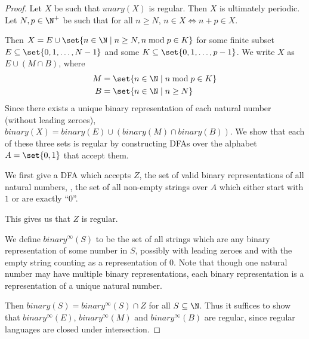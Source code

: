 \documentclass[12pt]{article}
\begin{document}
\begin{proof}
    Let $X$ be such that $unary(X)$ is regular.
    Then $X$ is ultimately periodic.
    Let $N, p \in \N^+$ be such that for all $n \ge N$, $n \in X \iff n + p
    \in X$.

    Then $X = E \cup \set{n \in \N \mid n \ge N, n \bmod p \in K}$ for
    some finite subset $E \subseteq \set{0, 1, \ldots, N-1}$ and some
    $K \subseteq \set{0, 1, \dots, p-1}$.
    We write $X$ as $E \cup (M \cap B)$, where \begin{align*}
        M &= \set{n \in \N \mid n \bmod p \in K} \\
        B &= \set{n \in \N \mid n \ge N}
    \end{align*}
    Since there exists a unique binary representation of each natural number
    (without leading zeroes), $binary(X) = binary(E) \cup (binary(M) \cap
    binary(B))$.
    We show that each of these three sets is regular by constructing DFAs
    over the alphabet $A = \set{0, 1}$ that accept them.

    We first give a DFA which accepts $Z$, the set of valid binary
    representations of all natural numbers, \ie, the set of all non-empty
    strings over $A$ which either start with $1$ or are exactly ``$0$''.
    \begin{center}
    \end{center}
    This gives us that $Z$ is regular.

    We define $binary^\infty(S)$ to be the set of all strings which are
    any binary representation of some number in $S$, possibly with leading
    zeroes and with the empty string counting as a representation of $0$.
    Note that though one natural number may have multiple binary
    representations, each binary representation is a representation of a
    unique natural number.

    Then $binary(S) = binary^\infty(S) \cap Z$ for all $S \subseteq \N$.
    Thus it suffices to show that $binary^\infty(E)$, $binary^\infty(M)$ and
    $binary^\infty(B)$ are regular, since regular languages are closed under
    intersection.


\end{proof}
\end{document}

